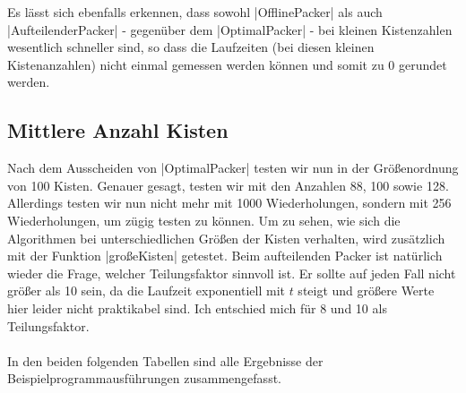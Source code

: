  Es lässt sich ebenfalls erkennen, dass sowohl |OfflinePacker| als auch |AufteilenderPacker| - gegenüber dem |OptimalPacker| -
  bei kleinen Kistenzahlen wesentlich schneller sind, so dass die Laufzeiten (bei diesen kleinen Kistenanzahlen) nicht einmal gemessen werden können
  und somit zu 0 gerundet werden.

\subsection{Mittlere Anzahl Kisten}
 Nach dem Ausscheiden von |OptimalPacker| testen wir nun in der Größenordnung von 100 Kisten.
 Genauer gesagt, testen wir mit den Anzahlen 88, 100 sowie 128.
 Allerdings testen wir nun nicht mehr mit 1000 Wiederholungen, sondern mit 256 Wiederholungen, um zügig testen zu können.
 Um zu sehen, wie sich die Algorithmen bei unterschiedlichen Größen der Kisten verhalten, wird zusätzlich mit der Funktion |großeKisten| getestet.
 Beim aufteilenden Packer ist natürlich wieder die Frage, welcher Teilungsfaktor sinnvoll ist.
 Er sollte auf jeden Fall nicht größer als 10 sein, da die Laufzeit exponentiell mit $t$ steigt und größere Werte hier leider nicht praktikabel sind.
 Ich entschied mich für 8 und 10 als Teilungsfaktor.
\paragraph{}
 In den beiden folgenden Tabellen sind alle Ergebnisse der Beispielprogrammausführungen zusammengefasst.

